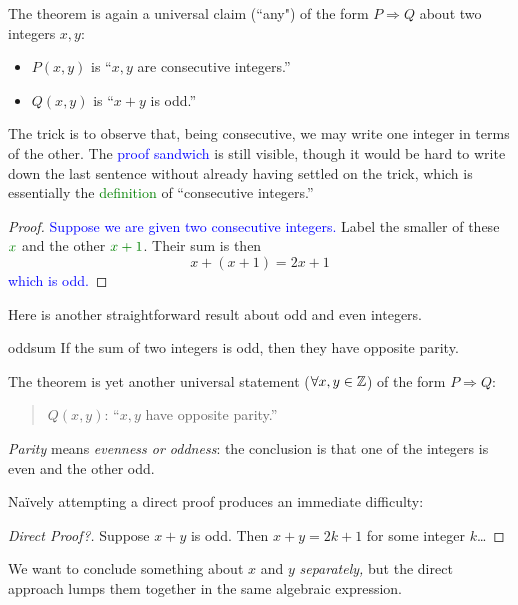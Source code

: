 The theorem is again a universal claim (``any") of the form $P\Longrightarrow Q$ about two integers $x,y$:
\begin{itemize}
	\item $P(x,y)$ is ``$x,y$ are consecutive integers.''
	\item $Q(x,y)$ is ``$x+y$ is odd.''
\end{itemize}

The trick is to observe that, being consecutive, we may write one integer in terms of the other. The \textcolor{blue}{proof sandwich} is still visible, though it would be hard to write down the last sentence without already having settled on the trick, which is essentially the \textcolor{Green}{definition} of ``consecutive integers.''
	
\begin{proof}
	\textcolor{blue}{Suppose we are given two consecutive integers.} Label the smaller of these $\textcolor{Green}{x}$ and the other $\textcolor{Green}{x+1}$. Their sum is then
	\[
		x+(x+1)=2x+1
	\]
	\textcolor{blue}{which is odd.}
\end{proof}


\goodbreak



Here is another straightforward result about odd and even integers.

\begin{thm}{}{oddsum}
	If the sum of two integers is odd, then they have opposite parity.
\end{thm}

The theorem is yet another universal statement ($\forall x,y\in\mathbb{Z}$) of the form $P\Longrightarrow Q$:
\begin{quote}
	$Q(x,y)$: ``$x,y$ have opposite parity.''
\end{quote}
\emph{Parity} means \emph{evenness or oddness}: the conclusion is that one of the integers is even and the other odd.\smallbreak

Naïvely attempting a direct proof produces an immediate difficulty:

\begin{proof}[Direct Proof?]
	Suppose $x+y$ is odd. Then $x+y=2k+1$ for some integer $k$\ldots\phantom{\qedhere}
\end{proof}

We want to conclude something about $x$ and $y$ \emph{separately,} but the direct approach lumps them together in the same algebraic expression.\smallbreak


